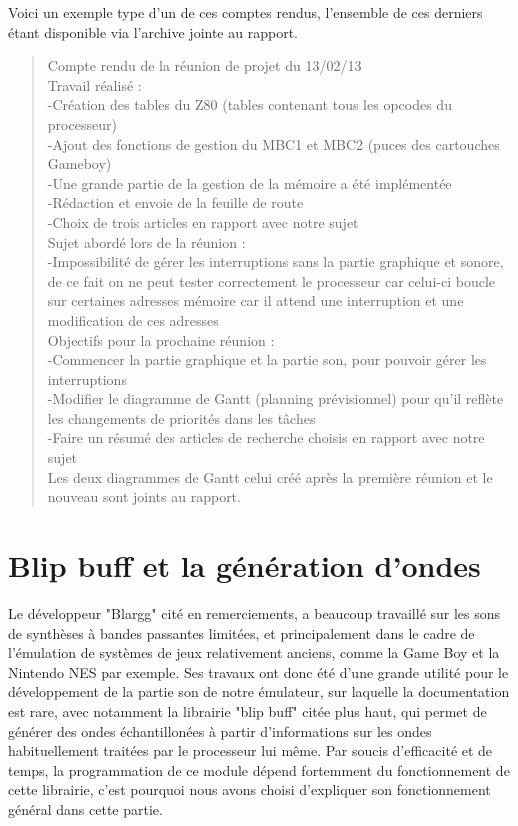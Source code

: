 \documentclass{report}
\begin{document}
Voici un exemple type d'un de ces comptes rendus, l'ensemble de ces derniers étant disponible via l'archive jointe au rapport.
\begin{quotation}
Compte rendu de la réunion de projet du 13/02/13\\
Travail réalisé :\\
	-Création des tables du Z80 (tables contenant tous les opcodes du processeur)\\
	-Ajout des fonctions de gestion du MBC1 et MBC2 (puces des cartouches Gameboy)\\
	-Une grande partie de la gestion de la mémoire a été implémentée\\
	-Rédaction et envoie de la feuille de route\\
	-Choix de trois articles en rapport avec notre sujet\\
Sujet abordé lors de la réunion :\\
	-Impossibilité de gérer les interruptions sans la partie graphique et sonore, de ce fait on ne peut tester correctement le processeur car celui-ci boucle sur certaines adresses mémoire car il attend une interruption et une modification de ces adresses\\
Objectifs pour la prochaine réunion :\\
	-Commencer la partie graphique et la partie son, pour pouvoir gérer les interruptions\\
	-Modifier le diagramme de Gantt (planning prévisionnel) pour qu’il reflète les changements de priorités dans les tâches\\
	-Faire un résumé des articles de recherche choisis en rapport avec notre sujet\\

Les deux diagrammes de Gantt celui créé après la première réunion et le nouveau sont joints au rapport.\\
\end{quotation}

\chapter{Blip buff et la génération d'ondes}
Le développeur "Blargg" cité en remerciements, a beaucoup travaillé sur les sons de synthèses à bandes passantes limitées, et principalement dans le cadre de l'émulation de systèmes de jeux relativement anciens, comme la Game Boy et la Nintendo NES par exemple. Ses travaux ont donc été d'une grande utilité pour le développement de la partie son de notre émulateur, sur laquelle la documentation est rare, avec notamment la librairie "blip buff" citée plus haut, qui permet de générer des ondes échantillonées à partir d'informations sur les ondes habituellement traitées par le processeur lui même. Par soucis d'efficacité et de temps, la programmation de ce module dépend fortemment du fonctionnement de cette librairie, c'est pourquoi nous avons choisi d'expliquer son fonctionnement général dans cette partie.\\
\end{document}
